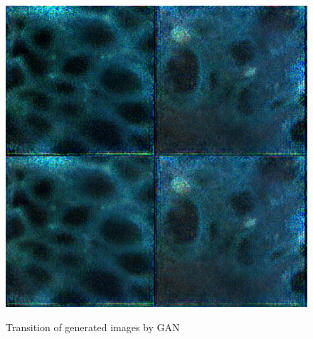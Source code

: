 \begin{figure}[H]
\begin{minipage}{0.24\columnwidth}
		\label{fig:}
	\end{minipage}
	\begin{minipage}{0.24\columnwidth}
		\centering
		\includegraphics[clip, width=\linewidth]{fig/generative_adversarial_nets/3208_0000}
		\label{fig:}
	\end{minipage}
	
	\caption{Transition of generated images by GAN}
	\label{fig:GANimage}
	
\end{figure}